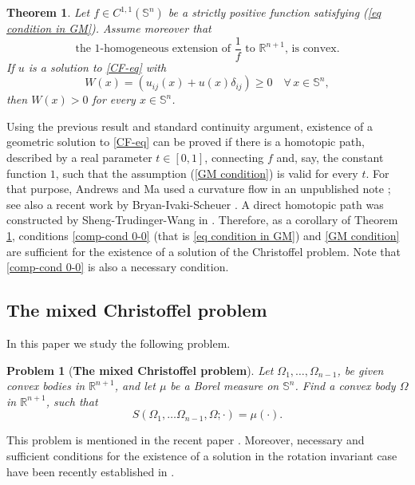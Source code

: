 \documentclass[12pt]{amsart}
\newtheorem{problem}[theorem]{Problem}
\newtheorem{thmx}{Theorem}
\newcommand{\R}{\mathbb R}
\newcommand{\1}{\mathbf 1}
\newcommand{\sfe}{{{\mathbb S}^{n}}}
\begin{document}
\begin{thmx}\label{GM thm}
Let $f\in C^{1,1}(\sfe)$ be a strictly positive function satisfying (\ref{eq condition in GM}).
Assume moreover that
\begin{equation}\label{GM condition}
\mbox{the $1$-homogeneous extension of $\dfrac 1f$ to $\R^{n+1}$, is convex.}    
\end{equation} 
If $u$ is a solution to \eqref{CF-eq} with 
$$
W(x)=(u_{ij}(x)+u(x)\delta_{ij})\ge 0\quad\forall\, x\in\sfe,
$$ 
then $W(x)>0$ for every $x\in\mathbb S^n$. 
\end{thmx}  

Using the previous result and standard continuity argument, existence of a geometric solution to \eqref{CF-eq} can be proved if there is a homotopic path, described by a real parameter $t\in[0,1]$, connecting $f$ and, say, the constant function $1$, such that the assumption (\ref{GM condition}) is valid for every $t$. For that purpose, Andrews and Ma used a curvature flow in an unpublished note \cite{AM}; see also a recent work by Bryan-Ivaki-Scheuer \cite{BIS}. A direct homotopic path was constructed by Sheng-Trudinger-Wang in \cite{STW}. Therefore, as a corollary of Theorem \ref{GM thm}, conditions \eqref{comp-cond 0-0} (that is \eqref{eq condition in GM}) and \eqref{GM condition} are sufficient for the existence of a solution of the Christoffel problem. Note that \eqref{comp-cond 0-0} is also a necessary condition.

\subsection{The mixed Christoffel problem} In this paper we study the following problem.

\begin{problem}[{\bf The mixed Christoffel problem}] Let $\Omega_1,\dots,\Omega_{n-1}$, be given convex bodies in $\R^{n+1}$, and let $\mu$ be a Borel measure on $\sfe$. Find a convex body $\Omega$ in $\R^{n+1}$, such that
\begin{equation}\label{MC problem}
S(\Omega_1,\dots\Omega_{n-1},\Omega;\cdot)=\mu(\cdot).
\end{equation}
\end{problem}

This problem is mentioned in the recent paper \cite{Huang-Yang-Zhang-2025}. Moreover, necessary and sufficient conditions for the existence of a solution in the rotation invariant case have been recently established in \cite{Brauner-Hofstatter-Ortega1, Brauner-Hofstatter-Ortega2, Mussnig-Ulivelli}.
\end{document}
